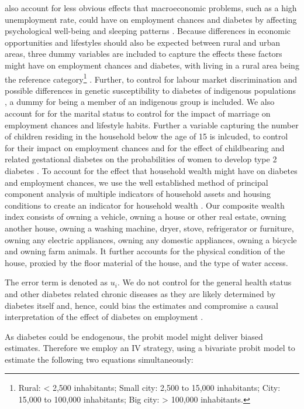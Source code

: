 also account for less obvious effects that macroeconomic problems,
such as a high unemployment rate, could have on employment chances
and diabetes by affecting psychological well-being and sleeping patterns
\parencite{Antillon2014}. Because differences in economic opportunities
and lifestyles should also be expected between rural and urban areas,
three dummy variables are included to capture the effects these factors
might have on employment chances and diabetes, with living in a rural
area being the reference category\footnote{Rural: < 2,500 inhabitants; Small city: 2,500 to 15,000 inhabitants;
City: 15,000 to 100,000 inhabitants; Big city: > 100,000 inhabitants. } \parencite{Villalpando2010}. Further, to control for labour market discrimination
and possible differences in genetic susceptibility to diabetes of
indigenous populations \parencite{Yu2007}, a dummy for being a member
of an indigenous group is included. We also account for for the marital
status to control for the impact of marriage on employment chances
and lifestyle habits. Further a variable capturing the number of children
residing in the household below the age of 15 is inlcuded, to control
for their impact on employment chances and for the effect of childbearing
and related gestational diabetes on the probabilities of women to
develop type 2 diabetes \parencite{Bellamy2009}. To account for the effect
that household wealth might have on diabetes and employment chances,
we use the well established method of principal component analysis
of multiple indicators of household assets and housing conditions
to create an indicator for household wealth \parencite{Filmer2001}. Our
composite wealth index consists of owning a vehicle, owning a house
or other real estate, owning another house, owning a washing machine,
dryer, stove, refrigerator or furniture, owning any electric appliances,
owning any domestic appliances, owning a bicycle and owning farm animals.
It further accounts for the physical condition of the house, proxied
by the floor material of the house, and the type of water access. 

The error term is denoted as $u_{i}$. We do not control
for the general health status and other diabetes related chronic diseases
as they are likely determined by diabetes itself and, hence, could
bias the estimates and compromise a causal interpretation of the effect
of diabetes on employment \parencite{Angrist2009a}.

As diabetes could be endogenous, the probit model might
deliver biased estimates. Therefore we employ an \ac{IV} strategy,
using a bivariate probit model to estimate the following two equations
simultaneously:


